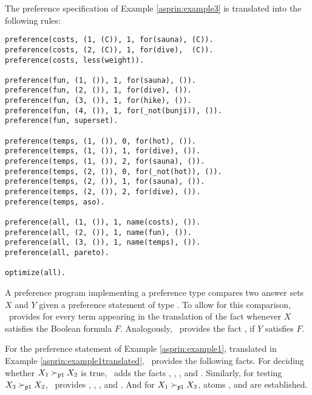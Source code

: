 \begin{example}
The preference specification of Example \ref{asprin:example3} is translated into the following rules:
\begin{lstlisting}[numbers=none,escapechar=?]
preference(costs, (1, (C)), 1, for(sauna), (C)).
preference(costs, (2, (C)), 1, for(dive),  (C)).
preference(costs, less(weight)).

preference(fun, (1, ()), 1, for(sauna), ()).
preference(fun, (2, ()), 1, for(dive), ()).
preference(fun, (3, ()), 1, for(hike), ()).
preference(fun, (4, ()), 1, for(_not(bunji)), ()).
preference(fun, superset).

preference(temps, (1, ()), 0, for(hot), ()).
preference(temps, (1, ()), 1, for(dive), ()).
preference(temps, (1, ()), 2, for(sauna), ()).
preference(temps, (2, ()), 0, for(_not(hot)), ()).
preference(temps, (2, ()), 1, for(sauna), ()).
preference(temps, (2, ()), 2, for(dive), ()).
preference(temps, aso).

preference(all, (1, ()), 1, name(costs), ()).
preference(all, (2, ()), 1, name(fun), ()).
preference(all, (3, ()), 1, name(temps), ()).
preference(all, pareto).

optimize(all).
\end{lstlisting}
\end{example}


A preference program implementing a preference type 
compares two answer sets $X$ and $Y$
given a preference statement  of type . %
To allow for this comparison, 
\asprin\ provides
for every term  appearing in the translation of 
the fact  
whenever $X$ satisfies the Boolean formula $F$.
Analogously, \asprin\ provides the fact , if $Y$ satisfies $F$.

\begin{example}
For the preference statement  of Example \ref{asprin:example1}, 
translated in Example \ref{asprin:example1translated}, \asprin\ provides the following facts. 
For deciding whether $X_1 \succ_{\texttt{p1}} X_2$ is true,
\asprin\ adds the facts
, , , and .
Similarly, for testing $X_3 \succ_{\texttt{p1}} X_2$, \asprin\ provides
, , ,  and .
And for $X_1 \succ_{\texttt{p1}} X_3$, 
atoms ,  and  are established.
\end{example}

